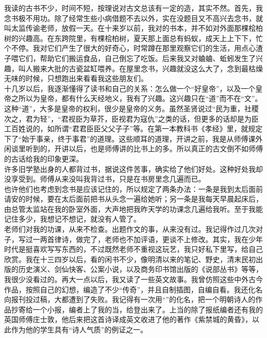 我读的古书不少，时间不短，按理说对古文总该有一定的造，其实不然。首先，我念书极不用功。除了经常生些小病借题不去以外，实在没题目又不高兴去念书，就叫太监传谕老师，放假一天。在十来岁以前，我对的书本，并不如对外面那棵桧柏树的兴趣高。在东跨院里，有棵桧柏树，夏天那上面总有蚂蚁，成天上上下下，忙个不停。我对它们产生了很大的好奇心，时常蹲在那里观察它们的生活，用点心渣子喂它们，帮助它们搬运食品，自己倒忘了吃饭。后来我又对蛐蛐、蚯蚓发生了兴趣，叫人搬来大批的古瓷盆缸喂养。在屋里念书，兴趣就没这么大了，念到最枯燥无味的时候，只想跑出来看看我这些朋友们。\\

十几岁以后，我逐渐懂得了读书和自己的关系：怎么做一个“好皇帝”，以及一个皇帝之所以为皇帝，都有什么天经地义，我有了兴趣。这兴趣只在“道”而不在“文”。这种“道”，大多是皇帝的权利，很少是皇帝的义务。虽然圣贤说过“民为重，社稷次之，君为轻”，“君视臣为草芥，臣视君为寇仇”之类的话，但更多的话却是为臣工百姓说的，如所谓“君君臣臣父父子子”等。在第一本教科书《孝经》里，就规定下了“始于事亲，终于事君”的道理。这些顺耳的道理，开讲之前，我是从师傅课外闲谈里听到的，开讲以后，也是师傅讲的比书上的多。所以真正的古文倒不如师傅的古话给我的印象更深。\\

许多旧学塾出身的人都背过书，据说这件苦事，确实给了他们好处。这种好处我却没享受到。师傅从来没叫我背过书，只是在书房里念几遍而已。\\

也许他们也考虑到念书是应该记住的，所以规定了两条办法：一条是我到太后面前请安的时候，要在太后面前把书从头念一遍给她听；另一条是我每天早晨起床后，由总管太监站在我的卧室外面，大声地把我昨天学的功课念几遍给我听。至于我能记住多少，我想记不想记，就没有人管了。\\

老师们对我的功课，从来不检查。出题作文的事，从来没有过。我记得作过几次对子，写过一两首律诗，做完了，老师也不加评语，更谈不上修改。其实，我在少年时代是挺喜欢写写东西的，不过既然老师不重视这玩艺，我只好私下里写，给自己欣赏。我在十三四岁以后，看的闲书不少，像明清以来的笔记、野史，清末民初出版的历史演义、剑仙快客、公案小说，以及商务印书馆出版的《说部丛书》等等，我很少没看过的。再大一点以后，我又读了一些英文故事。我曾仿照这些中外古今作品，按照自己的幻想，编造了不少“传奇”，并且自制插图，自编自看。我还化名向报刊投过稿，大都遭到了失败。我记得有一次用“”的化名，把一个明朝诗人的作品抄寄给一个小报，编者上了我的当，给登出来了。上当的除了报纸编者还有我的英国师傅庄士敦，他后来把这首诗译成英文收进了他的著作《紫禁城的黄昏》，以此作为他的学生具有“诗人气质”的例证之一。\\

